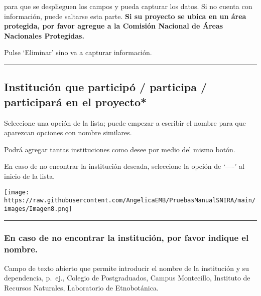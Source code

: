 \documentclass[
]{book}
\begin{document}
para que se desplieguen los campos y pueda capturar los datos. Si no cuenta con información, puede saltarse esta parte.
\textbf{Si su proyecto se ubica en un área protegida, por favor agregue a la Comisión Nacional de Áreas Nacionales Protegidas.}

Pulse `Eliminar' sino va a capturar información.

\begin{center}\rule{0.5\linewidth}{0.5pt}\end{center}

\hypertarget{instituciuxf3n-que-participuxf3-participa-participaruxe1-en-el-proyecto}{%
\subsection*{\texorpdfstring{{Institución que participó / participa / participará en el proyecto*}}{Institución que participó / participa / participará en el proyecto*}}\label{instituciuxf3n-que-participuxf3-participa-participaruxe1-en-el-proyecto}}

Seleccione una opción de la lista; puede empezar a escribir el nombre para que aparezcan opciones con nombre similares.

Podrá agregar tantas instituciones como desee por medio del mismo botón.

En caso de no encontrar la institución deseada, seleccione la opción de `----' al inicio de la lista.

\texttt{[image: https://raw.githubusercontent.com/AngelicaEMB/PruebasManualSNIRA/main/images/Imagen8.png]}

\begin{center}\rule{0.5\linewidth}{0.5pt}\end{center}

\hypertarget{en-caso-de-no-encontrar-la-instituciuxf3n-por-favor-indique-el-nombre.-1}{%
\subsubsection*{En caso de no encontrar la institución, por favor indique el nombre.}\label{en-caso-de-no-encontrar-la-instituciuxf3n-por-favor-indique-el-nombre.-1}}

Campo de texto abierto que permite introducir el nombre de la institución y su dependencia, p.~ej., Colegio de Postgraduados, Campus Montecillo, Instituto de Recursos Naturales, Laboratorio de Etnobotánica.
\end{document}
